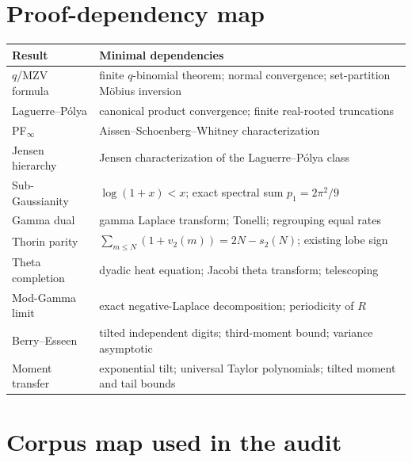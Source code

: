 \documentclass[11pt]{article}
\numberwithin{equation}{section}
\theoremstyle{definition}
\theoremstyle{remark}
\begin{document}
\section{Proof-dependency map}

\begin{longtable}{@{}p{}p{}@{}}
\toprule
Result & Minimal dependencies\\
\midrule
\endhead
$q$/MZV formula & finite $q$-binomial theorem; normal convergence; set-partition
M\"obius inversion\\
Laguerre--P\'olya & canonical product convergence; finite real-rooted
truncations\\
PF$_\infty$ & Aissen--Schoenberg--Whitney characterization\\
Jensen hierarchy & Jensen characterization of the Laguerre--P\'olya class\\
Sub-Gaussianity & $\log(1+x)<x$; exact spectral sum $p_1=2\pi^2/9$\\
Gamma dual & gamma Laplace transform; Tonelli; regrouping equal rates\\
Thorin parity & $\sum_{m\le N}(1+v_2(m))=2N-s_2(N)$; existing lobe sign\\
Theta completion & dyadic heat equation; Jacobi theta transform; telescoping\\
Mod-Gamma limit & exact negative-Laplace decomposition; periodicity of $R$\\
Berry--Esseen & tilted independent digits; third-moment bound; variance asymptotic\\
Moment transfer & exponential tilt; universal Taylor polynomials; tilted moment
and tail bounds\\
\bottomrule
\end{longtable}

\section{Corpus map used in the audit}
\end{document}
